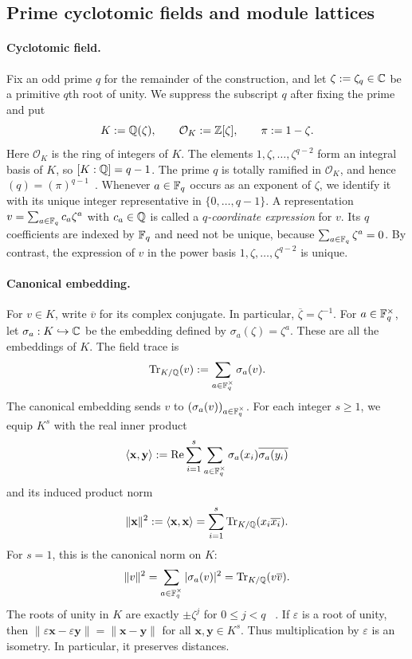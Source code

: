 \subsection{Prime cyclotomic fields and module lattices}

\paragraph{Cyclotomic field.}
Fix an odd prime $q$ for the remainder of the construction, and let
$\zeta:=\zeta_q\in\mathbb C$ be a primitive $q$th root of unity.  We suppress the
subscript $q$ after fixing the prime and put
\[
 K:=\mathbb Q(\zeta),
 \qquad
 \mathcal{O}_K:=\mathbb Z[\zeta],
 \qquad
 \pi:=1-\zeta.
\]
Here $\mathcal{O}_K$ is the ring of integers of $K$.  The elements
$1,\zeta,\ldots,\zeta^{q-2}$ form an integral basis of $K$, so
$[K:\mathbb Q]=q-1$.  The prime $q$ is totally ramified in $\mathcal{O}_K$, and hence
$(q)=(\pi)^{q-1}$~\cite{Washington97}.  Whenever $a\in\mathbb F_q$ occurs as an
exponent of $\zeta$, we identify it with its unique integer representative in
$\{0,\ldots,q-1\}$.  A representation
$v=\sum_{a\in\mathbb F_q}c_a\zeta^a$ with $c_a\in\mathbb Q$ is called a
\emph{$q$-coordinate expression}
for $v$.  Its $q$ coefficients are indexed by $\mathbb F_q$ and need not be unique,
because $\sum_{a\in\mathbb F_q}\zeta^a=0$.  By contrast, the expression of $v$ in
the power basis $1,\zeta,\ldots,\zeta^{q-2}$ is unique.

\paragraph{Canonical embedding.}
For $v\in K$, write $\overline v$ for its complex conjugate.  In particular,
$\overline\zeta=\zeta^{-1}$.  For $a\in\mathbb F_q^\times$, let
$\sigma_a:K\hookrightarrow\mathbb C$ be the embedding defined by
$\sigma_a(\zeta)=\zeta^a$.  These are all the embeddings of $K$.  The field
trace is
\[
 \operatorname{Tr}_{K/\mathbb Q}(v):=\sum_{a\in\mathbb F_q^\times}\sigma_a(v).
\]
 The canonical embedding sends $v$ to
 $(\sigma_a(v))_{a\in\mathbb F_q^\times}$.  For each integer $s\ge1$, we
 equip $K^s$ with the real inner product
\[
 \langle\mathbf x,\mathbf y\rangle
 :=\operatorname{Re}\sum_{i=1}^s\sum_{a\in\mathbb F_q^\times}
   \sigma_a(x_i)\overline{\sigma_a(y_i)}
\]
and its induced product norm
\[
 \|\mathbf x\|^2:=\langle\mathbf x,\mathbf x\rangle
 =\sum_{i=1}^s\operatorname{Tr}_{K/\mathbb Q}(x_i\overline{x_i}).
\]
For $s=1$, this is the canonical norm on $K$:
\[
 \|v\|^2=\sum_{a\in\mathbb F_q^\times}|\sigma_a(v)|^2
 =\operatorname{Tr}_{K/\mathbb Q}(v\overline v).
\]
The roots of unity in $K$ are exactly $\pm\zeta^j$ for $0\le j<q$
~\cite{Washington97}.  If $\varepsilon$ is a root of unity, then
$\|\varepsilon\mathbf x-\varepsilon\mathbf y\|=\|\mathbf x-\mathbf y\|$
for all $\mathbf x,\mathbf y\in K^s$.  Thus multiplication by
$\varepsilon$ is an isometry.  In particular, it preserves distances.

